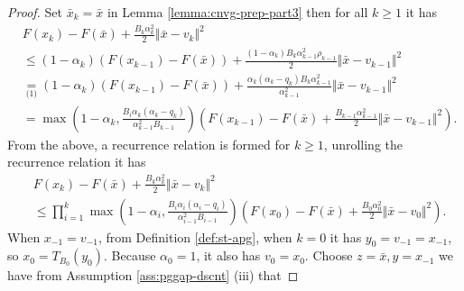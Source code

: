 \documentclass[12pt]{article}
\begin{document}
            \begin{proof}
                Set $\bar x_k = \bar x$ in Lemma \ref{lemma:cnvg-prep-part3} then for all $k\ge 1$ it has 
                \begin{align*}
                    & F(x_k) - F(\bar x) + \frac{B_k\alpha_k^2}{2}\Vert \bar x- v_k\Vert^2 
                    \\
                    &\le \left(
                        1 - \alpha_k
                    \right)(F(x_{k- 1}) - F(\bar x))
                    + \frac{(1 - \alpha_k)B_k\alpha_{k -1}^2 \rho_{k - 1}}{2}\Vert \bar x - v_{k - 1}\Vert^2
                    \\
                    &\underset{\text{(1)}}{=} 
                    \left(
                        1 - \alpha_k
                    \right)(F(x_{k- 1}) - F(\bar x))
                    + \frac{\alpha_k(\alpha_k - q_k)B_k\alpha_{k - 1}^2}{\alpha_{k - 1}^2}\Vert \bar x - v_{k - 1}\Vert^2
                    \\
                    &= \max\left(
                        1 - \alpha_k, 
                        \frac{B_i\alpha_k(\alpha_k - q_k)}{\alpha_{k - 1}^2B_{k - 1}}
                    \right)
                    \left(
                        F(x_{k - 1}) - F(\bar x)
                        + \frac{B_{k - 1}\alpha_{k - 1}^2}{2}\Vert \bar x - v_{k - 1}\Vert^2
                    \right). 
                \end{align*}
                From the above, a recurrence relation is formed for $k \ge 1$, unrolling the recurrence relation it has 
                \begin{align*}
                    & F(x_k) - F(\bar x) + \frac{B_k\alpha_k^2}{2}\Vert \bar x- v_k\Vert^2 
                    \\&\le 
                    \prod_{i = 1}^k\max\left(
                        1 - \alpha_i, 
                        \frac{B_i\alpha_i(\alpha_i - q_i)}{\alpha_{i - 1}^2B_{i - 1}}
                    \right)
                    \left(
                        F(x_0) - F(\bar x)
                        + \frac{B_0\alpha_0^2}{2}\Vert \bar x - v_0\Vert^2
                    \right). 
                \end{align*}
                When $x_{-1} = v_{-1}$, from Definition \ref{def:st-apg}, when $k = 0$ it has $y_0 = v_{-1} = x_{-1}$, so $x_0 = T_{B_0}(y_0)$. 
                Because $\alpha_0 = 1$, it also has $v_0 = x_0$. 
                Choose $z = \bar x, y = x_{-1}$ we have from Assumption \ref{ass:pggap-dscnt} (iii) that

\end{proof}
\end{document}

